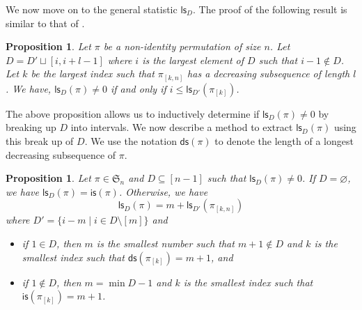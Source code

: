 \documentclass[12pt]{article}
\newcommand{\is}{\mathsf{is}}
\newcommand{\ds}{\mathsf{ds}}
\newcommand{\ls}{\mathsf{ls}}
\newcommand{\s}{\mathfrak{S}}
\newtheorem{proposition}[theorem]{Proposition}
\theoremstyle{definition}
\begin{document}
We now move on to the general statistic $\ls_D$. 
The proof of the following result is similar to that of .

\begin{proposition}
    Let $\pi$ be a non-identity permutation of size $n$. 
    Let $D = D' \sqcup [i, i + l - 1]$ where $i$ is the largest element of $D$ such that $i - 1 \notin D$. 
    Let $k$ be the largest index such that $\pi_{[k, n]}$ has a decreasing subsequence of length $l$. 
    We have, $\ls_D(\pi) \neq 0$ if and only if $i \leq \ls_{D'}(\pi_{[k]})$.
\end{proposition}



The above proposition allows us to inductively determine if $\ls_D(\pi) \neq 0$ by breaking up $D$ into intervals. 
We now describe a method to extract $\ls_D(\pi)$ using this break up of $D$. 
We use the notation $\ds(\pi)$ to denote the length of a longest decreasing subsequence of $\pi$.

\begin{proposition}
    Let $\pi \in \s_n$ and $D \subseteq [n - 1]$ such that $\ls_D(\pi) \neq 0$. 
    If $D = \varnothing$, we have $\ls_D(\pi) = \is(\pi)$. 
    Otherwise, we have
    \begin{equation*}
        \ls_D(\pi) = m + \ls_{D'}(\pi_{[k, n]})
    \end{equation*}
    where $D' = \{i - m \mid i \in D \setminus [m]\}$ and
    \begin{itemize}
        \item if $1 \in D$, then $m$ is the smallest number such that $m + 1 \notin D$ and $k$ is the smallest index such that $\ds(\pi_{[k]}) = m + 1$, and
        \item if $1 \notin D$, then $m = \min D - 1$ and $k$ is the smallest index such that $\is(\pi_{[k]}) = m + 1$.
    \end{itemize}
\end{proposition}
\end{document}
